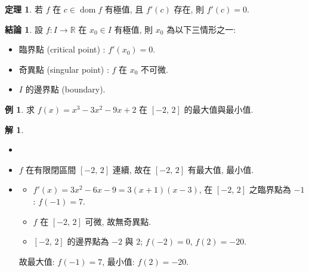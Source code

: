 \documentclass[12pt,a4paper]{extarticle}
\newcommand{\ds}{\displaystyle}
\DeclareMathOperator*{\dom}{dom}
\theoremstyle{definition}
\newtheorem*{fact}{結論}
\newtheorem*{thm}{定理}
\newtheorem*{ex}{例}
\newtheorem*{sol}{解}
\begin{document}
\begin{thm}
  若 $f$ 在 $c\in\dom f$ 有極值, 且 $f'(c)$ 存在, 則 $f'(c) = 0$. 
\end{thm}

\begin{fact}
  設 $f:I\to\mathbb{R}$ 在 $x_0\in I$ 有極值, 則 $x_0$ 為以下三情形之一: 
    \begin{itemize}\setlength\itemsep{0em}
      \item 臨界點 (critical point) : $\ds f'(x_0) = 0$. 
      \item 奇異點 (singular point) : $f$ 在 $x_0$ 不可微.  
      \item $I$ 的邊界點 (boundary). 
    \end{itemize}
\end{fact}

\begin{ex}
  求 $f(x) = x^3 - 3 x^2 - 9x + 2$ 在 $[-2,\,2]$ 的最大值與最小值. 
\end{ex}

\begin{sol}
  \begin{itemize}\setlength\itemsep{0em}
    \item[]
    \item $f$ 在有限閉區間 $[-2,\,2]$ 連續, 故在 $[-2,\,2]$ 有最大值, 最小值. 
    \item 
      \begin{itemize}\setlength\itemsep{0em}
        \item $\ds f'(x) = 3 x^2 - 6 x - 9 = 3(x + 1)(x - 3)$, 在 $[-2,\,2]$ 之臨界點為 $-1$: $f(-1) = 7$. 
        \item $f$ 在 $[-2,\,2]$ 可微, 故無奇異點. 
        \item $[-2,\,2]$ 的邊界點為 $-2$ 與 $2$; $f(-2) = 0$, $f(2) = -20$. 
      \end{itemize}
      故最大值: $f(-1) = 7$, 最小值: $f(2) = -20$. 
  \end{itemize}
\end{sol}
\end{document}
